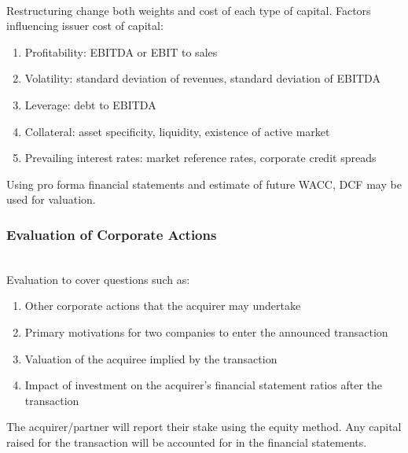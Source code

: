 \begin{method} \\
Restructuring change both weights and cost of each type of capital. Factors influencing issuer cost of capital:
\begin{enumerate}[label=\roman*.]
\setlength{\itemsep}{0pt}
\item Profitability: EBITDA or EBIT to sales
\item Volatility: standard deviation of revenues, standard deviation of EBITDA
\item Leverage: debt to EBITDA
\item Collateral: asset specificity, liquidity, existence of active market
\item Prevailing interest rates: market reference rates, corporate credit spreads
\end{enumerate}
Using pro forma financial statements and estimate of future WACC, DCF may be used for valuation.
\end{method}

\subsubsection{Evaluation of Corporate Actions}

\begin{remark} \\
Evaluation to cover questions such as:
\begin{enumerate}[label=\roman*.]
\setlength{\itemsep}{0pt}
\item Other corporate actions that the acquirer may undertake
\item Primary motivations for two companies to enter the announced transaction
\item Valuation of the acquiree implied by the transaction
\item Impact of investment on the acquirer's financial statement ratios after the transaction
\end{enumerate}
The acquirer/partner will report their stake using the equity method. Any capital raised for the transaction will be accounted for in the financial statements.
\end{remark}

